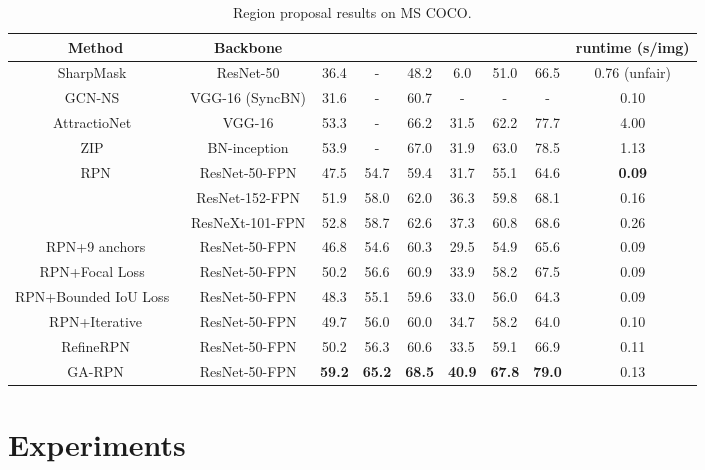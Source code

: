 \documentclass[10pt,twocolumn,letterpaper]{article}
\begin{document}
\begin{table*}[!ht]
	\centering
	\caption{\small{Region proposal results on MS COCO.}}
	\small{
	\begin{tabular}{*{9}{c}}
		\toprule
		Method & Backbone &  &  &  &  &  &  & runtime (s/img) \\
		\midrule
		SharpMask~\cite{SharpMask} & ResNet-50 & 36.4 & -   & 48.2 & 6.0  & 51.0 & 66.5 & 0.76 (unfair) \\
		GCN-NS~\cite{lu2018toward} & VGG-16 (SyncBN) & 31.6 & - & 60.7 & - & - & - & 0.10 \\
		AttractioNet~\cite{gidaris2016attendbmvc} & VGG-16 & 53.3 & -    & 66.2 & 31.5 & 62.2 & 77.7 & 4.00 \\
		ZIP~\cite{li2017zoom} & BN-inception & 53.9    & -    & 67.0    & 31.9 & 63.0 & 78.5 & 1.13 \\
		\midrule
		\multirow{3}{*}{RPN} & ResNet-50-FPN & 47.5 & 54.7 & 59.4 & 31.7 & 55.1 & 64.6 & \textbf{0.09} \\
		& ResNet-152-FPN & 51.9 & 58.0 & 62.0 & 36.3 & 59.8 & 68.1 & 0.16 \\
		& ResNeXt-101-FPN & 52.8 & 58.7 & 62.6 & 37.3 & 60.8 & 68.6 & 0.26 \\
		\midrule
		RPN+9 anchors & ResNet-50-FPN & 46.8 & 54.6 & 60.3 & 29.5 & 54.9 & 65.6 & 0.09 \\
		RPN+Focal Loss~\cite{lin2017focal} & ResNet-50-FPN & 50.2 & 56.6 & 60.9 & 33.9 & 58.2 & 67.5 & 0.09 \\
		RPN+Bounded IoU Loss~\cite{tychsen2018improving}  & ResNet-50-FPN & 48.3 & 55.1 & 59.6 & 33.0 & 56.0 & 64.3 & 0.09 \\
		RPN+Iterative & ResNet-50-FPN & 49.7 & 56.0 & 60.0 & 34.7 & 58.2 & 64.0 & 0.10 \\
		RefineRPN     & ResNet-50-FPN & 50.2 & 56.3 & 60.6 & 33.5 & 59.1 & 66.9 & 0.11 \\
		\midrule
		GA-RPN & ResNet-50-FPN & \textbf{59.2} & \textbf{65.2} & \textbf{68.5} & \textbf{40.9} & \textbf{67.8} & \textbf{79.0} & 0.13 \\
		\bottomrule
	\end{tabular}
	}
	\vspace{-10pt}
	\label{tab:rpn-results-coco}
\end{table*}

\section{Experiments}
\label{sec:experiments}
\end{document}
